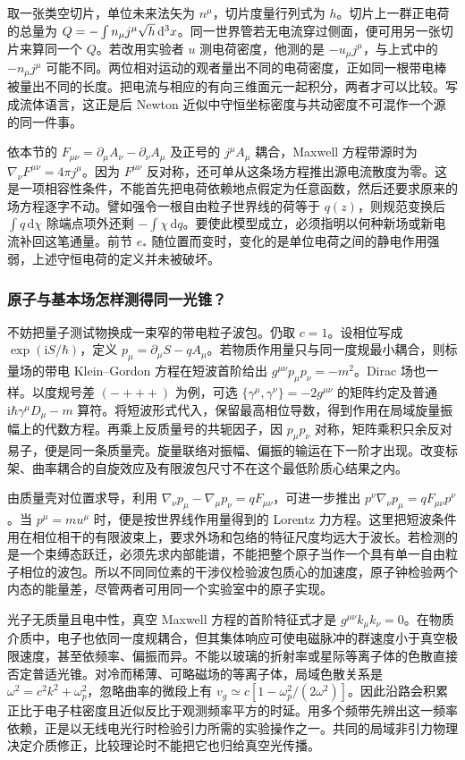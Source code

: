 取一张类空切片，单位未来法矢为 $n^\mu$，切片度量行列式为 $h$。切片上一群正电荷的总量为 $Q=-\int n_\mu j^\mu\sqrt h\,\dd^3x$。同一世界管若无电流穿过侧面，便可用另一张切片来算同一个 $Q$。若改用实验者 $u$ 测电荷密度，他测的是 $-u_\mu j^\mu$，与上式中的 $-n_\mu j^\mu$ 可能不同。两位相对运动的观者量出不同的电荷密度，正如同一根带电棒被量出不同的长度。把电流与相应的有向三维面元一起积分，两者才可以比较。写成流体语言，这正是后 Newton 近似中守恒坐标密度与共动密度不可混作一个源的同一件事。

依本节的 $F_{\mu\nu}=\partial_\mu A_\nu-\partial_\nu A_\mu$ 及正号的 $j^\mu A_\mu$ 耦合，Maxwell 方程带源时为 $\nabla_\nu F^{\mu\nu}=4\pi j^\mu$。因为 $F^{\mu\nu}$ 反对称，还可单从这条场方程推出源电流散度为零。这是一项相容性条件，不能首先把电荷依赖地点假定为任意函数，然后还要求原来的场方程逐字不动。譬如强令一根自由粒子世界线的荷等于 $q(z)$，则规范变换后 $\int q\,\mathrm d\chi$ 除端点项外还剩 $-\int\chi\,\mathrm d q$。要使此模型成立，必须指明以何种新场或新电流补回这笔通量。前节 $e_*$ 随位置而变时，变化的是单位电荷之间的静电作用强弱，上述守恒电荷的定义并未被破坏。

\subsubsection{原子与基本场怎样测得同一光锥？}

不妨把量子测试物换成一束窄的带电粒子波包。仍取 $c=1$。设相位写成 $\exp(\mathrm{i}S/\hbar)$，定义 $p_\mu=\partial_\mu S-qA_\mu$。若物质作用量只与同一度规最小耦合，则标量场的带电 Klein--Gordon 方程在短波首阶给出 $g^{\mu\nu}p_\mu p_\nu=-m^2$。Dirac 场也一样。以度规号差 $(-+++)$ 为例，可选 $\{\gamma^\mu,\gamma^\nu\}=-2g^{\mu\nu}$ 的矩阵约定及普通 $\mathrm i\hbar\gamma^\mu D_\mu-m$ 算符。将短波形式代入，保留最高相位导数，得到作用在局域旋量振幅上的代数方程。再乘上反质量号的共轭因子，因 $p_\mu p_\nu$ 对称，矩阵乘积只余反对易子，便是同一条质量壳。旋量联络对振幅、偏振的输运在下一阶才出现。改变标架、曲率耦合的自旋效应及有限波包尺寸不在这个最低阶质心结果之内。

由质量壳对位置求导，利用 $\nabla_\nu p_\mu-\nabla_\mu p_\nu=qF_{\mu\nu}$，可进一步推出 $p^\nu\nabla_\nu p_\mu=qF_{\mu\nu}p^\nu$。当 $p^\mu=mu^\mu$ 时，便是按世界线作用量得到的 Lorentz 力方程。这里把短波条件用在相位相干的有限波束上，要求外场和包络的特征尺度均远大于波长。若检测的是一个束缚态跃迁，必须先求内部能谱，不能把整个原子当作一个具有单一自由粒子相位的波包。所以不同同位素的干涉仪检验波包质心的加速度，原子钟检验两个内态的能量差，尽管两者可用同一个实验室中的原子实现。

光子无质量且电中性，真空 Maxwell 方程的首阶特征式才是 $g^{\mu\nu}k_\mu k_\nu=0$。在物质介质中，电子也依同一度规耦合，但其集体响应可使电磁脉冲的群速度小于真空极限速度，甚至依频率、偏振而异。不能以玻璃的折射率或星际等离子体的色散直接否定普适光锥。对冷而稀薄、可略磁场的等离子体，局域色散关系是 $\omega^2=c^2k^2+\omega_p^2$，忽略曲率的微段上有 $v_g\simeq c[1-\omega_p^2/(2\omega^2)]$。因此沿路会积累正比于电子柱密度且近似反比于观测频率平方的时延。用多个频带先辨出这一频率依赖，正是以无线电光行时检验引力所需的实验操作之一。共同的局域非引力物理决定介质修正，比较理论时不能把它也归给真空光传播。

